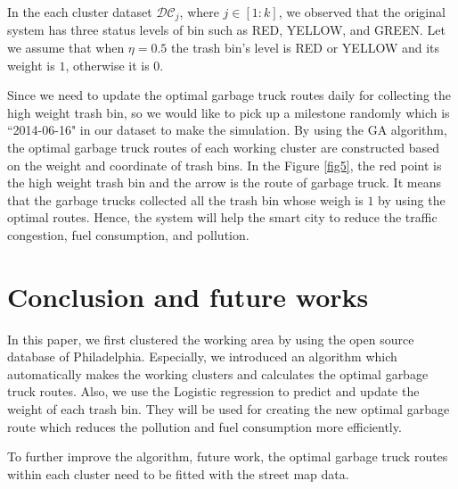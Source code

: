 \documentclass[conference]{IEEEtran}
\begin{document}
In the each cluster dataset $\mathcal{DC}_j$, where $j \in [1:k]$, we observed that the original system has three status levels of bin such as RED, YELLOW, and GREEN. Let we assume that when $\eta = 0.5$ the trash bin's level is RED or YELLOW and its weight is $1$, otherwise it is $0$.

\par Since we need to update the optimal garbage truck routes daily for collecting the high weight trash bin, so we would like to pick up a milestone randomly which is ``2014-06-16" in our dataset to make the simulation. By using the GA algorithm, the optimal garbage truck routes of each working cluster are constructed based on the weight and coordinate of trash bins. In the Figure \ref{fig5}, the red point is the high weight trash bin and the arrow is the route of garbage truck. It means that the garbage trucks collected all the trash bin whose weigh is $1$ by using the optimal routes. Hence, the system will help the smart city to reduce the traffic congestion, fuel consumption, and pollution.






\section{Conclusion and future works}
\label{section4}

In this paper, we first clustered the working area by using the open source database of Philadelphia. Especially, we introduced an algorithm which automatically makes the working clusters and calculates the optimal garbage truck routes. Also, we use the Logistic regression to predict and update the weight of each trash bin. They will be used for creating the new optimal garbage route which reduces the pollution and fuel consumption more efficiently.  

To further improve the algorithm, future work, the optimal garbage truck routes within each cluster need to be fitted with the street map data.


%
%
\end{document}

